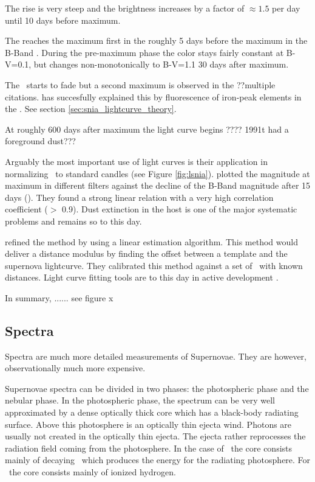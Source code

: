 The rise is very steep and the brightness increases by a factor of $\approx 1.5$ per day until 10 days before maximum. 

The \snia reaches the maximum first in the \nir roughly 5 days before the maximum in the B-Band \citep{2000MNRAS.314..782M}. 
During the pre-maximum phase the color stays fairly constant at B-V=0.1, but changes non-monotonically to B-V=1.1 30 days after maximum. 

The \snia\ starts to fade but  a second maximum is observed in the \nir \citep{2008ApJ...689..377W} ??multiple citations.  \citep{2006ApJ...649..939K} has succesfully explained this by fluorescence of iron-peak elements in the \nir. See section \ref{sec:snia_lightcurve_theory}.

At roughly 600 days after maximum the light curve begins ???? 1991t had a foreground dust??? 


Arguably the most important use of light curves is their application in normalizing \sneia\ to standard candles (see Figure \ref{fig:lsnia}). \citet[][]{1993ApJ...413L.105P} plotted the magnitude at maximum in different filters against the decline of the B-Band magnitude after 15 days (\dmb).  They found a strong linear relation with a very high correlation coefficient ($>$ 0.9). Dust extinction in the host is one of the major systematic problems and remains so to this day. 

\cite{1995ApJ...438L..17R} refined the method by using a linear estimation algorithm. This method would deliver a distance modulus by finding the offset between a template and the supernova lightcurve. They calibrated this method against a set of \sneia\ with known distances. 
Light curve fitting tools are to this day in active development \cite[e.g.][]{2007ApJ...659..122J, 2007A&A...466...11G}.

In summary, ...... see figure x


\subsection{Spectra} 

Spectra are much more detailed measurements of Supernovae. They are however, observationally much more expensive. 

Supernovae spectra can be divided in two phases: the photospheric phase and the nebular phase.
In the photospheric phase, the spectrum can be very well approximated by a dense optically thick core which has a black-body radiating surface. Above this photosphere is an  optically thin ejecta wind. Photons are usually not created in the optically thin ejecta. The ejecta rather reprocesses the radiation field coming from the photosphere. 
In the case of \sneia\ the core consists mainly of decaying \Ni\ which produces the energy for the radiating photosphere. For \sneii\ the core consists mainly of ionized hydrogen.

